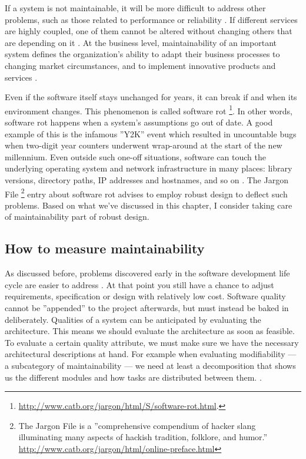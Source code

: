 \documentclass[utf8,english]{gradu3}
\begin{document}
If a system is not maintainable, it will be more difficult to address other
problems, such as those related to performance or reliability \parencite[46]{Bouwers2010}.
If different services are highly coupled, one of them cannot be altered without changing
others that are depending on it \parencite[2]{Vale2022}. At the business level,
maintainability of an important system defines the organization's ability to
adapt their business processes to changing market circumstances, and to
implement innovative products and services \parencite[21]{Broy2006}.

Even if the software itself stays unchanged for years, it can break if and when
its environment changes. This phenomenon is called software rot
\footnote{\url{http://www.catb.org/jargon/html/S/software-rot.html}.}. In other
words, software rot happens when a system's assumptions go out of date. A good
example of this is the infamous ''Y2K'' event which resulted in uncountable bugs
when two-digit year counters underwent wrap-around at the start of the new
millennium. Even outside such one-off situations, software can touch the
underlying operating system and network infrastructure in many places: library
versions, directory paths, IP addresses and hostnames, and so on
\parencite{Heroku2011}. The Jargon File \footnote{The Jargon File is a
  ''comprehensive compendium of hacker slang illuminating many aspects of hackish
  tradition, folklore, and humor.''
  \url{http://www.catb.org/jargon/html/online-preface.html}} entry about software
rot advises to employ robust design to deflect such problems. Based on what
we've discussed in this chapter, I consider taking care of maintainability part
of robust design.


\subsection{How to measure maintainability}
\label{section:how-to-measure-maintainability}

As discussed before, problems discovered early in the software development life
cycle are easier to address \parencite{Bass1998}. At that point you still have a
chance to adjust requirements, specification or design with relatively low cost.
Software quality cannot be ''appended'' to the project afterwards, but must
instead be baked in deliberately. Qualities of a system can be anticipated by
evaluating the architecture. This means we should evaluate the architecture as
soon as feasible. To evaluate a certain quality attribute, we must make sure we
have the necessary architectural descriptions at hand. For example when
evaluating modifiability --- a subcategory of maintainability --- we need at
least a decomposition that shows us the different modules and how tasks are
distributed between them. \parencite[32, 190-191]{Bass1998}.
\end{document}
